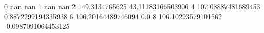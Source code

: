 0 nan nan
1 nan nan
2 149.3134765625 43.11183166503906
4 107.08887481689453 0.8872299194335938
6 106.20164489746094 0.0
8 106.10293579101562 -0.0987091064453125
